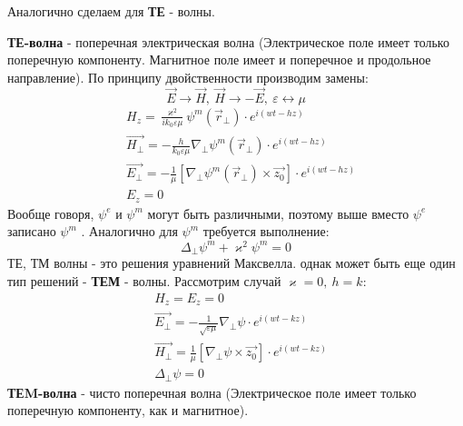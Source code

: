 Аналогично сделаем для \textbf{ТЕ} - волны.

\textbf{ТЕ-волна} - поперечная электрическая волна (Электрическое поле имеет только поперечную компоненту. Магнитное поле имеет и поперечное и
продольное направление). По принципу двойственности производим замены:
\begin{equation}
  \vec{E}\rightarrow\vec{H},~ \vec{H}\rightarrow-\vec{E},~ \varepsilon \leftrightarrow \mu 
\end{equation}
\begin{align*}
  &H_z = \frac{\varkappa^2}{ik_0\varepsilon\mu} \psi^m(\vec{r}_{\perp})\cdot e^{i(wt-hz)}\\
  &\vec{H_{\perp}} = -\frac{h}{k_0\varepsilon\mu}\nabla_{\perp} \psi^m(\vec{r}_{\perp})\cdot e^{i(wt-hz)}\\
  &\vec{E_{\perp}} = -\frac{1}{\mu}[\nabla_{\perp} \psi^m(\vec{r}_{\perp})\times\vec{z_0}]\cdot e^{i(wt-hz)}\\
  &E_z = 0
\end{align*}
Вообще говоря, $\psi^e$ и $\psi^m$ могут быть различными, поэтому выше вместо $\psi^e$ записано $\psi^m$ . Аналогично
для $\psi^m$ требуется выполнение:
\begin{equation}
  \Delta_{\perp}\psi^m+\varkappa^2\psi^m=0
\end{equation}
ТЕ, ТМ волны - это решения уравнений Максвелла. однак может быть еще один тип решений - \textbf{ТЕМ} - волны.
Рассмотрим случай $\varkappa = 0,~ h=k$:
\begin{align*}
  &H_z = E_z = 0 \\
  &\vec{E_{\perp}} = -\frac{1}{\sqrt{\varepsilon\mu}}\nabla_{\perp} \psi\cdot e^{i(wt-kz)}\\
  &\vec{H_{\perp}} = \frac{1}{\mu}[\nabla_{\perp} \psi\times\vec{z_0}]\cdot e^{i(wt-kz)}\\
  &\Delta_{\perp}\psi=0
\end{align*}
\textbf{ТЕM-волна} - чисто поперечная волна (Электрическое поле имеет только поперечную компоненту, как и магнитное).

